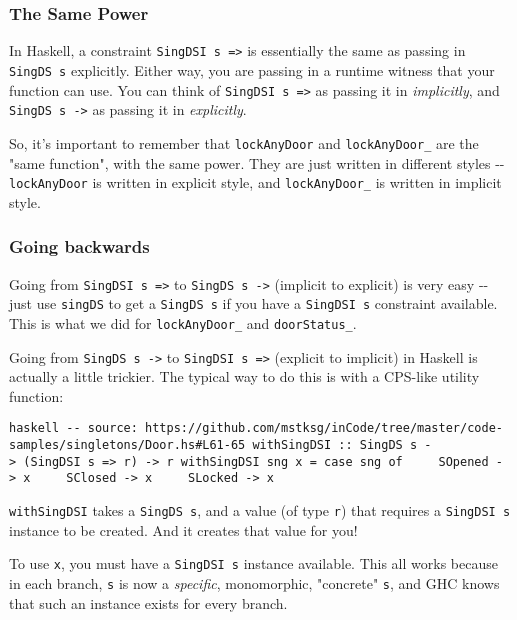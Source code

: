 \documentclass[]{article}
\begin{document}
\subsubsection{The Same Power}

In Haskell, a constraint \texttt{SingDSI\ s\ =\textgreater{}} is essentially the
same as passing in \texttt{SingDS\ s} explicitly. Either way, you are passing in
a runtime witness that your function can use. You can think of
\texttt{SingDSI\ s\ =\textgreater{}} as passing it in \emph{implicitly}, and
\texttt{SingDS\ s\ -\textgreater{}} as passing it in \emph{explicitly}.

So, it's important to remember that \texttt{lockAnyDoor} and
\texttt{lockAnyDoor\_} are the "same function", with the same power. They are
just written in different styles -\/- \texttt{lockAnyDoor} is written in
explicit style, and \texttt{lockAnyDoor\_} is written in implicit style.

\subsubsection{Going backwards}

Going from \texttt{SingDSI\ s\ =\textgreater{}} to
\texttt{SingDS\ s\ -\textgreater{}} (implicit to explicit) is very easy -\/-
just use \texttt{singDS} to get a \texttt{SingDS\ s} if you have a
\texttt{SingDSI\ s} constraint available. This is what we did for
\texttt{lockAnyDoor\_} and \texttt{doorStatus\_}.

Going from \texttt{SingDS\ s\ -\textgreater{}} to
\texttt{SingDSI\ s\ =\textgreater{}} (explicit to implicit) in Haskell is
actually a little trickier. The typical way to do this is with a CPS-like
utility function:

\texttt{haskell\ -\/-\ source:\ https://github.com/mstksg/inCode/tree/master/code-samples/singletons/Door.hs\#L61-65\ withSingDSI\ ::\ SingDS\ s\ -\textgreater{}\ (SingDSI\ s\ =\textgreater{}\ r)\ -\textgreater{}\ r\ withSingDSI\ sng\ x\ =\ case\ sng\ of\ \ \ \ \ SOpened\ -\textgreater{}\ x\ \ \ \ \ SClosed\ -\textgreater{}\ x\ \ \ \ \ SLocked\ -\textgreater{}\ x}

\texttt{withSingDSI} takes a \texttt{SingDS\ s}, and a value (of type
\texttt{r}) that requires a \texttt{SingDSI\ s} instance to be created. And it
creates that value for you!

To use \texttt{x}, you must have a \texttt{SingDSI\ s} instance available. This
all works because in each branch, \texttt{s} is now a \emph{specific},
monomorphic, "concrete" \texttt{s}, and GHC knows that such an instance exists
for every branch.
\end{document}
